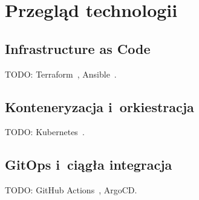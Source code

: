 \chapter{Przegląd technologii}

\section{Infrastructure as Code}
TODO: Terraform~\cite{devops-directive-terraform}, Ansible~\cite{ansible-getting-started}.

\section{Konteneryzacja i~orkiestracja}
TODO: Kubernetes~\cite{devops-directive-kubernetes,kubernetes-docs}.

\section{GitOps i~ciągła integracja}
TODO: GitHub Actions~\cite{github-actions-quickstart}, ArgoCD.
